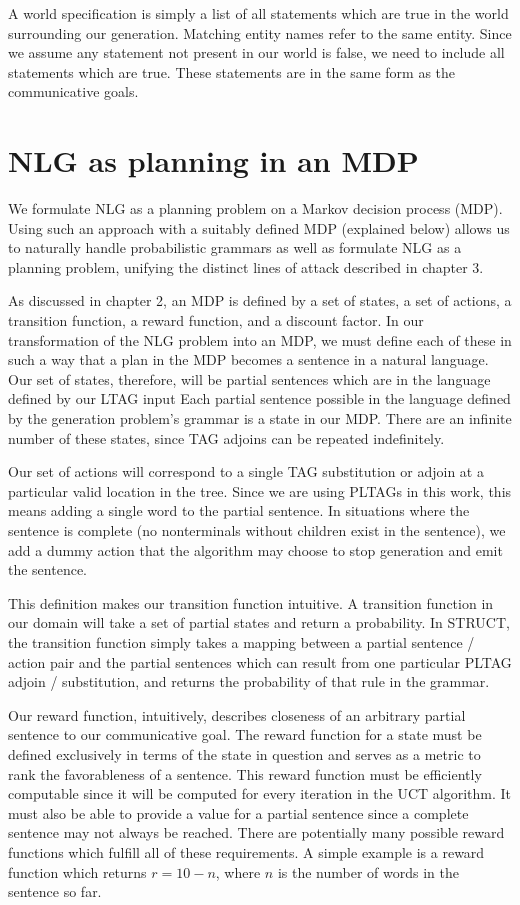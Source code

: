 A world specification is simply a list of all statements which are true in the world surrounding our generation.
Matching entity names refer to the same entity.  Since we assume any statement not present
in our world is false, we need to include all statements which are true.  These statements are in
the same form as the communicative goals.

\section{NLG as planning in an MDP}
We formulate NLG as a planning problem on a Markov decision process
(MDP).  Using such an approach with a suitably defined MDP
(explained below) allows us to naturally handle
probabilistic grammars as well as formulate NLG as a planning problem,
unifying the distinct lines of attack described in chapter 3.

As discussed in chapter 2, an MDP is defined by a set of states, a set of
actions, a transition function, a reward function, and a discount factor.
In our transformation of the NLG problem into an MDP, we must define
each of these in such a way that a plan in the MDP becomes a sentence
in a natural language.  Our set of states, therefore, will be partial
sentences which are in the language defined by our LTAG input
Each partial sentence possible in the language defined by
the generation problem's grammar is a state in our MDP.  There are
an infinite number of these states, since TAG adjoins can be
repeated indefinitely.

Our set of actions will correspond to a single
TAG substitution or adjoin at a particular valid location in the tree.
Since we are using PLTAGs in this work,
this means adding a single word to the partial sentence.
In situations where the sentence is complete (no nonterminals without
children exist in the sentence),
we add a dummy action that the algorithm may choose 
to stop generation and emit the sentence.

This definition makes our transition function intuitive.  A transition
function in our domain will take a set of partial states and return
a probability.  In STRUCT, the transition function simply takes a
mapping between a partial sentence / action pair and the partial
sentences which can result from one particular PLTAG adjoin / substitution,
and returns the probability of that rule in the grammar.

Our reward function, intuitively, describes closeness of an arbitrary
partial sentence to our communicative
goal.  The reward function for a state must be defined exclusively in terms
 of the state in question and serves as a metric to
 rank the favorableness of a sentence.  This reward function must be
 efficiently computable since it will be computed for every iteration
 in the UCT algorithm.  It must also be able to provide a value for a
 partial sentence since a complete sentence
 may not always be reached.  There are potentially many
possible reward functions which fulfill all of these requirements.
A simple example is a reward function which returns $r = 10 - n$, where
$n$ is the number of words in the sentence so far.

